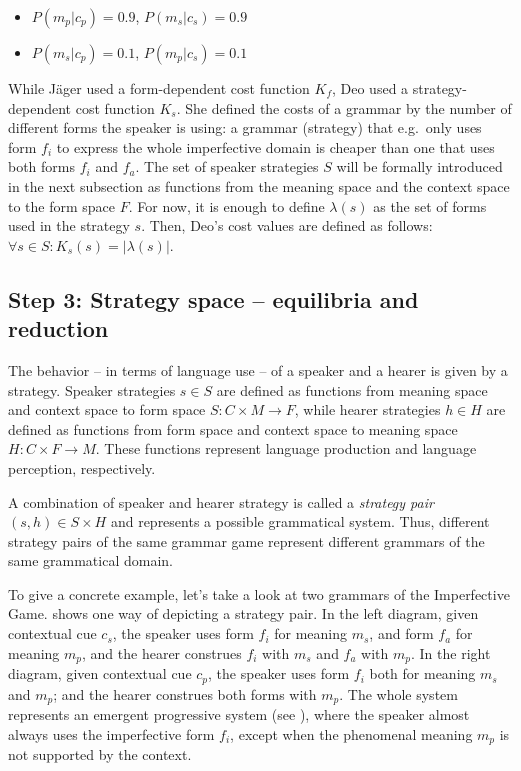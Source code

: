 \documentclass[output=paper,hidelinks]{langscibook}
\begin{document}
\begin{itemize}%
\item $P(m_p|c_p) = 0.9$, $P(m_s|c_s) = 0.9$
\item $P(m_s|c_p) = 0.1$, $P(m_p|c_s) = 0.1$
\end{itemize}

While  Jäger used a form-dependent cost function $K_f$, Deo used a strategy-dependent cost function $K_s$. She defined the  costs of a grammar by the number of different forms the speaker is using:  a grammar (strategy) that e.g.~only uses form $f_i$ to express the whole imperfective domain is cheaper than one that uses both forms $f_i$ and $f_a$. 
The set of speaker strategies $S$ will be formally introduced in the next subsection as functions from the meaning space and the context space to the form space $F$. For now, it is enough to define $\lambda(s)$ as the set of forms used in the strategy $s$.
Then, Deo's cost values are defined as follows: $\forall s \in S: K_s(s) = |\lambda(s)|$.


\subsection{Step 3: Strategy space -- equilibria and reduction}
\label{sec:strat+payoff}

The behavior -- in terms of language use -- of a speaker and a hearer is given by a strategy. Speaker strategies $s \in S$ are defined as  functions from meaning space and context space to form space $S: C \times M \rightarrow F$, while hearer strategies $h \in H$ are defined as functions from form space and context space to meaning space $H: C \times F \rightarrow M$. These functions represent language production and language perception, respectively. 

A combination of speaker and hearer strategy is called a \emph{strategy pair} $(s,h) \in S \times H$ and represents a possible grammatical system. Thus, different strategy pairs of the same grammar game represent different grammars of the same grammatical domain.

To give a concrete example, let's take a look at two grammars of the Imperfective Game.  shows one way of depicting a strategy pair. In the left diagram, given contextual cue $c_s$, the speaker uses form $f_{i}$ for meaning $m_s$, and form $f_{a}$ for meaning $m_p$, and the hearer construes $f_{i}$ with $m_s$ and $f_{a}$ with $m_p$. In the right diagram, given contextual cue $c_p$, the speaker uses form $f_{i}$ both for meaning $m_s$ and $m_p$; and the hearer construes both forms with $m_p$. The whole system represents an emergent progressive system (see ), where the speaker almost always uses the imperfective form $f_{i}$, except when the phenomenal meaning $m_p$ is not supported by the context.
\end{document}
